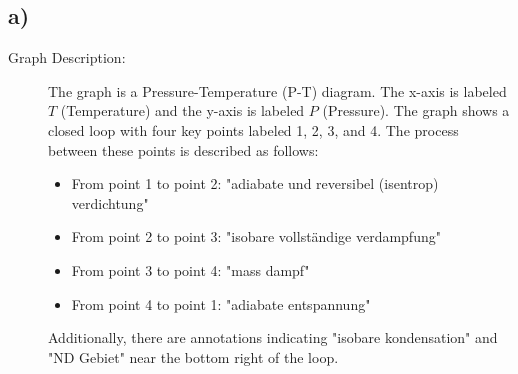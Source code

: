 

\subsection*{a)}

\begin{description}
    \item[Graph Description:] The graph is a Pressure-Temperature (P-T) diagram. The x-axis is labeled \( T \) (Temperature) and the y-axis is labeled \( P \) (Pressure). The graph shows a closed loop with four key points labeled 1, 2, 3, and 4. The process between these points is described as follows:
    \begin{itemize}
        \item From point 1 to point 2: "adiabate und reversibel (isentrop) verdichtung"
        \item From point 2 to point 3: "isobare vollständige verdampfung"
        \item From point 3 to point 4: "mass dampf"
        \item From point 4 to point 1: "adiabate entspannung"
    \end{itemize}
    Additionally, there are annotations indicating "isobare kondensation" and "ND Gebiet" near the bottom right of the loop.
\end{description}